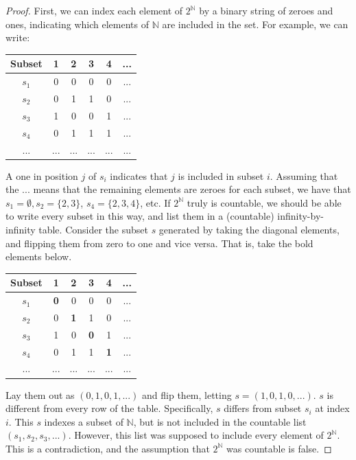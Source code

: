 \documentclass[11pt]{article}
\newcommand{\N}{\ensuremath{\mathbb N}}
\theoremstyle{plain}
\theoremstyle{definition}
\theoremstyle{remark}
\begin{document}
\begin{proof}
    First, we can index each element of $2^{\N}$ by a binary string of zeroes and ones, indicating which elements of $\N$ are included in the set. For example, we can write:
    \begin{center}
    \begin{tabular}{ |c|c c c c c| } 
         \hline
         Subset & 1 & 2 & 3 & 4 & ... \\ 
         \hline
         $s_1$ & 0 & 0 & 0 & 0 & ... \\ 
         $s_2$ & 0 & 1 & 1 & 0 & ... \\
         $s_3$ & 1 & 0 & 0 & 1 & ... \\
         $s_4$ & 0 & 1 & 1 & 1 & ... \\
         ... & ... & ... & ... & ... & ... \\
         \hline
    \end{tabular}
    \end{center}
    A one in position $j$ of $s_i$ indicates that $j$ is included in subset $i$. Assuming that the $...$ means that the remaining elements are zeroes for each subset, we have that $s_1 = \emptyset, s_2 = \{2, 3\}$, $s_4 = \{2, 3, 4\}$, etc. If $2^{\N}$ truly is countable, we should be able to write every subset in this way, and list them in a (countable) infinity-by-infinity table. Consider the subset $s$ generated by taking the diagonal elements, and flipping them from zero to one and vice versa. That is, take the bold elements below.
    \begin{center}
    \begin{tabular}{ |c|c c c c c| } 
         \hline
         Subset & 1 & 2 & 3 & 4 & ... \\ 
         \hline
         $s_1$ & \bf 0 & 0 & 0 & 0 & ... \\ 
         $s_2$ & 0 & \bf 1 & 1 & 0 & ... \\
         $s_3$ & 1 & 0 & \bf 0 & 1 & ... \\
         $s_4$ & 0 & 1 & 1 & \bf 1 & ... \\
         ... & ... & ... & ... & ... & ... \\
         \hline
    \end{tabular}
    \end{center}
    Lay them out as $(0, 1, 0, 1, ...)$ and flip them, letting $s = (1, 0, 1, 0, ...)$. $s$ is different from every row of the table. Specifically, $s$ differs from subset $s_i$ at index $i$. This $s$ indexes a subset of $\N$, but is not included in the countable list $(s_1, s_2, s_3, ...)$. However, this list was supposed to include every element of $2^{\N}$. This is a contradiction, and the assumption that $2^{\N}$ was countable is false.
\end{proof}
\end{document}

